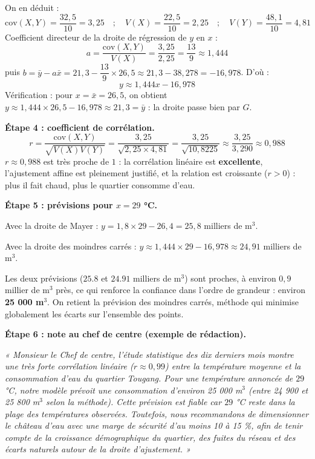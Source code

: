 \documentclass[11pt]{article}
\begin{document}
\begin{exoresolu}
On en déduit :
\[
\mathrm{cov}(X,Y)=\frac{32{,}5}{10}=3{,}25 \quad ; \quad V(X)=\frac{22{,}5}{10}=2{,}25 \quad ; \quad V(Y)=\frac{48{,}1}{10}=4{,}81
\]
Coefficient directeur de la droite de régression de $y$ en $x$ :
\[
a=\frac{\mathrm{cov}(X,Y)}{V(X)}=\frac{3{,}25}{2{,}25}=\frac{13}{9}\approx 1{,}444
\]
puis $b=\bar{y}-a\bar{x}=21{,}3-\dfrac{13}{9}\times 26{,}5\approx 21{,}3-38{,}278=-16{,}978$. D'où :
\[
\boxed{y\approx 1{,}444x-16{,}978}
\]
Vérification : pour $x=\bar{x}=26{,}5$, on obtient $y\approx 1{,}444\times 26{,}5-16{,}978\approx 21{,}3=\bar{y}$ : la droite passe bien par $G$.

\textbf{Étape 4 : coefficient de corrélation.}
\[
r=\frac{\mathrm{cov}(X,Y)}{\sqrt{V(X)V(Y)}}=\frac{3{,}25}{\sqrt{2{,}25\times 4{,}81}}=\frac{3{,}25}{\sqrt{10{,}8225}}\approx \frac{3{,}25}{3{,}290}\approx 0{,}988
\]
$r\approx 0{,}988$ est très proche de $1$ : la corrélation linéaire est \textbf{excellente}, l'ajustement affine est pleinement justifié, et la relation est croissante ($r>0$) : plus il fait chaud, plus le quartier consomme d'eau.

\textbf{Étape 5 : prévisions pour $x=29$ °C.}

Avec la droite de Mayer : $y=1{,}8\times 29-26{,}4=25{,}8$ milliers de m$^3$.

Avec la droite des moindres carrés : $y\approx 1{,}444\times 29-16{,}978\approx 24{,}91$ milliers de m$^3$.

Les deux prévisions ($\num{25,8}$ et $\num{24,91}$ milliers de m$^3$) sont proches, à environ $0{,}9$ millier de m$^3$ près, ce qui renforce la confiance dans l'ordre de grandeur : environ \textbf{25 000 m$^3$}. On retient la prévision des moindres carrés, méthode qui minimise globalement les écarts sur l'ensemble des points.

\textbf{Étape 6 : note au chef de centre (exemple de rédaction).}

\emph{« Monsieur le Chef de centre, l'étude statistique des dix derniers mois montre une très forte corrélation linéaire ($r\approx 0{,}99$) entre la température moyenne et la consommation d'eau du quartier Tougang. Pour une température annoncée de $29$ °C, notre modèle prévoit une consommation d'environ 25 000 m$^3$ (entre 24 900 et 25 800 m$^3$ selon la méthode). Cette prévision est fiable car $29$ °C reste dans la plage des températures observées. Toutefois, nous recommandons de dimensionner le château d'eau avec une marge de sécurité d'au moins 10 à 15 \%, afin de tenir compte de la croissance démographique du quartier, des fuites du réseau et des écarts naturels autour de la droite d'ajustement. »}
\end{exoresolu}
\end{document}
